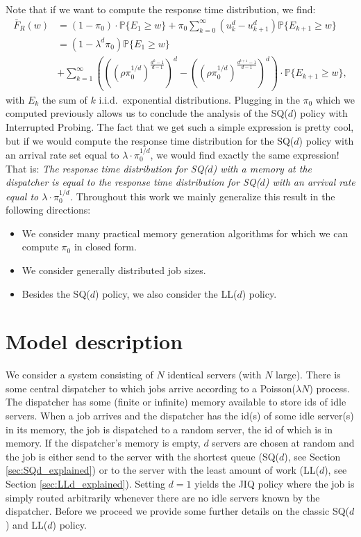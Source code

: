 \documentclass[12pt]{report}
\begin{document}
Note that if we want to compute the response time distribution, we find:
\begin{align*}
\bar F_R(w)
&=
(1-\pi_0) \cdot \mathbb{P}\{E_1 \geq w\} + \pi_0 \sum_{k=0}^\infty (u_k^d - u_{k+1}^d)  \mathbb{P}\{E_{k+1} \geq w\}\\
&=(1-\lambda^d \pi_0) \mathbb{P}\{E_1 \geq w\}\\
& + \sum_{k=1}^\infty \left( \left( (\rho \pi_0^{1/d})^{\frac{d^k-1}{d-1}} \right)^d - \left( (\rho \pi_0^{1/d})^{\frac{d^{k+1}-1}{d-1}} \right)^d \right) \cdot \mathbb{P}\{E_{k+1} \geq w\},
\end{align*}
with $E_k$ the sum of $k$ i.i.d.~exponential distributions.
Plugging in the $\pi_0$ which we computed previously allows us to conclude the analysis of the SQ($d$) policy with Interrupted Probing.
The fact that we get such a simple expression is pretty cool, but if we would compute the response time distribution for the SQ($d$) policy with an arrival rate set equal to $\lambda \cdot \pi_0^{1/d}$, we would find exactly the same expression! That is: \textit{The response time distribution for SQ($d$) with a memory at the dispatcher is equal to the response time distribution for SQ($d$) with an arrival rate equal to $\lambda \cdot \pi_0^{1/d}$.} Throughout this work we mainly generalize this result in the following directions:
\begin{itemize}
	\item We consider many practical memory generation algorithms for which we can compute $\pi_0$ in closed form.
	\item We consider generally distributed job sizes.
	\item Besides the SQ($d$) policy, we also consider the LL($d$) policy.
\end{itemize}

\section{Model description}\label{sec:model_description_memory}
We consider a system consisting of $N$ identical servers (with $N$ large). There is some central dispatcher to which jobs arrive according to a Poisson($\lambda N$) process. The dispatcher has some
(finite or infinite) memory available to store ids of idle servers. When a job arrives and the dispatcher has the id(s) of some idle server(s) in its memory, the job is dispatched to 
a random server, the id of which is in memory. If the dispatcher's memory is empty, $d$ servers are chosen at random and the job is either send to the server with the shortest queue (SQ($d$), see Section \ref{sec:SQd_explained}) or to the server with the least amount of work (LL($d$), see Section \ref{sec:LLd_explained}). Setting $d=1$ yields the JIQ policy where the job is simply routed arbitrarily whenever there are no idle servers known by the dispatcher. Before we proceed we provide some further details on the classic SQ($d$) and LL($d$) policy.
\end{document}
